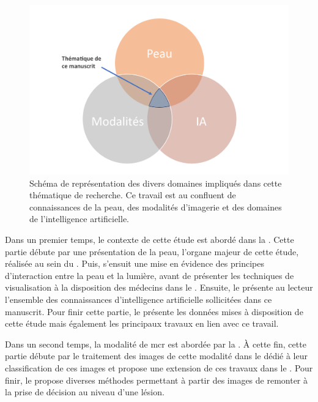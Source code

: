\begin{figure}[H]
    \centering
    \includegraphics[width=0.8\linewidth]{contents/i_introduction/resources/scheme_our_work.pdf}
    \caption{Schéma de représentation des divers domaines impliqués dans cette thématique de recherche. Ce travail est au confluent de connaissances de la peau, des modalités d'imagerie et des domaines de l'intelligence artificielle.}
    \label{fig:scheme_our_work}
\end{figure}\par

Dans un premier temps, le contexte de cette étude est abordé dans la . Cette partie débute par une présentation de la peau, l'organe majeur de cette étude, réalisée au sein du . Puis, s'ensuit une mise en évidence des principes d'interaction entre la peau et la lumière, avant de présenter les techniques de visualisation à la disposition des médecins dans le . Ensuite, le  présente au lecteur l'ensemble des connaissances d'intelligence artificielle sollicitées dans ce manuscrit. Pour finir cette partie, le  présente les données mises à disposition de cette étude mais également les principaux travaux en lien avec ce travail.\par

Dans un second temps, la modalité de \gls{mcr} est abordée par la . À cette fin, cette partie débute par le traitement des images de cette modalité dans le  dédié à leur classification de ces images et propose une extension de ces travaux dans le . Pour finir, le  propose diverses méthodes permettant à partir des images de remonter à la prise de décision au niveau d'une lésion.\par

